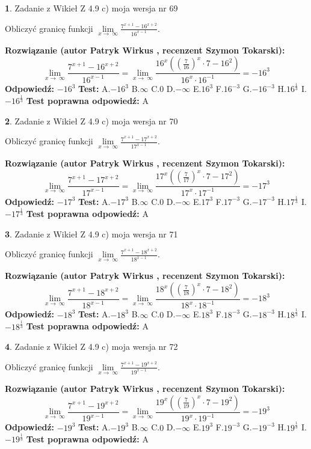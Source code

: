 \documentclass[12pt, a4paper]{article}
\theoremstyle{definition} %
\newtheorem{zad}{}
\newcommand{\zadStart}[1]{\begin{zad}#1\newline}
\newcommand{\zadStop}{\end{zad}}
\newcommand{\rozwStart}[2]{\noindent \textbf{Rozwiązanie (autor #1 , recenzent #2): }\newline}
\newcommand{\rozwStop}{\newline}
\newcommand{\odpStart}{\noindent \textbf{Odpowiedź:}\newline}
\newcommand{\odpStop}{\newline}
\newcommand{\testStart}{\noindent \textbf{Test:}\newline}
\newcommand{\testStop}{\newline}
\newcommand{\kluczStart}{\noindent \textbf{Test poprawna odpowiedź:}\newline}
\newcommand{\kluczStop}{\newline}
\begin{document}
\zadStart{Zadanie z Wikieł Z 4.9 c) moja wersja nr 69}


Obliczyć granicę funkcji  $\lim\limits_{x\to\ \infty}\frac{7^{x+1}-16^{x+2}}{16^{x-1}}$.
\zadStop
\rozwStart{Patryk Wirkus}{Szymon Tokarski}
$$\lim\limits_{x\to\ \infty}\frac{7^{x+1}-16^{x+2}}{16^{x-1}}=\lim\limits_{x\to\ \infty}\frac{16^{x}((\frac{7}{16})^{x}\cdot 7 -16^{2})}{16^{x}\cdot 16^{-1}} = -16^{3}$$
\rozwStop
\odpStart
$-16^{3}$
\odpStop
\testStart
A.$-16^{3}$ B.$\infty$ C.$0$ D.$-\infty$ E.$16^{3}$
F.$16^{-3}$ G.$-16^{-3}$
H.$16^{\frac{1}{3}}$
I.$-16^{\frac{1}{3}}$
\testStop
\kluczStart
A
\kluczStop



\zadStart{Zadanie z Wikieł Z 4.9 c) moja wersja nr 70}


Obliczyć granicę funkcji  $\lim\limits_{x\to\ \infty}\frac{7^{x+1}-17^{x+2}}{17^{x-1}}$.
\zadStop
\rozwStart{Patryk Wirkus}{Szymon Tokarski}
$$\lim\limits_{x\to\ \infty}\frac{7^{x+1}-17^{x+2}}{17^{x-1}}=\lim\limits_{x\to\ \infty}\frac{17^{x}((\frac{7}{17})^{x}\cdot 7 -17^{2})}{17^{x}\cdot 17^{-1}} = -17^{3}$$
\rozwStop
\odpStart
$-17^{3}$
\odpStop
\testStart
A.$-17^{3}$ B.$\infty$ C.$0$ D.$-\infty$ E.$17^{3}$
F.$17^{-3}$ G.$-17^{-3}$
H.$17^{\frac{1}{3}}$
I.$-17^{\frac{1}{3}}$
\testStop
\kluczStart
A
\kluczStop



\zadStart{Zadanie z Wikieł Z 4.9 c) moja wersja nr 71}


Obliczyć granicę funkcji  $\lim\limits_{x\to\ \infty}\frac{7^{x+1}-18^{x+2}}{18^{x-1}}$.
\zadStop
\rozwStart{Patryk Wirkus}{Szymon Tokarski}
$$\lim\limits_{x\to\ \infty}\frac{7^{x+1}-18^{x+2}}{18^{x-1}}=\lim\limits_{x\to\ \infty}\frac{18^{x}((\frac{7}{18})^{x}\cdot 7 -18^{2})}{18^{x}\cdot 18^{-1}} = -18^{3}$$
\rozwStop
\odpStart
$-18^{3}$
\odpStop
\testStart
A.$-18^{3}$ B.$\infty$ C.$0$ D.$-\infty$ E.$18^{3}$
F.$18^{-3}$ G.$-18^{-3}$
H.$18^{\frac{1}{3}}$
I.$-18^{\frac{1}{3}}$
\testStop
\kluczStart
A
\kluczStop



\zadStart{Zadanie z Wikieł Z 4.9 c) moja wersja nr 72}


Obliczyć granicę funkcji  $\lim\limits_{x\to\ \infty}\frac{7^{x+1}-19^{x+2}}{19^{x-1}}$.
\zadStop
\rozwStart{Patryk Wirkus}{Szymon Tokarski}
$$\lim\limits_{x\to\ \infty}\frac{7^{x+1}-19^{x+2}}{19^{x-1}}=\lim\limits_{x\to\ \infty}\frac{19^{x}((\frac{7}{19})^{x}\cdot 7 -19^{2})}{19^{x}\cdot 19^{-1}} = -19^{3}$$
\rozwStop
\odpStart
$-19^{3}$
\odpStop
\testStart
A.$-19^{3}$ B.$\infty$ C.$0$ D.$-\infty$ E.$19^{3}$
F.$19^{-3}$ G.$-19^{-3}$
H.$19^{\frac{1}{3}}$
I.$-19^{\frac{1}{3}}$
\testStop
\kluczStart
A
\kluczStop
\end{document}
